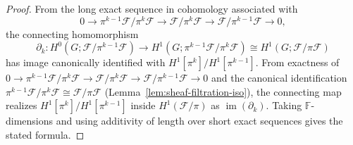 \documentclass[11pt]{amsart}
\theoremstyle{plain}
\theoremstyle{definition}
\newcommand{\unif}{\pi}                        %
\newcommand{\sheaf}[1]{\mathcal{#1}}                  %
\newcommand{\Digit}[1]{\partial_{#1}}%
\DeclareMathOperator{\im}{im}                         %
\begin{document}
\begin{proof}
From the long exact sequence in cohomology associated with
\[
0 \to \unif^{k-1}\sheaf{F}/\unif^k\sheaf{F} \to \sheaf{F}/\unif^k\sheaf{F} \to \sheaf{F}/\unif^{k-1}\sheaf{F} \to 0,
\]
the connecting homomorphism
\[
\Digit{k}: H^0(G;\sheaf{F}/\unif^{k-1}\sheaf{F}) \to H^1(G;\unif^{k-1}\sheaf{F}/\unif^k\sheaf{F}) \cong H^1(G;\sheaf{F}/\unif\sheaf{F})
\]
has image canonically identified with $H^1[\unif^k]/H^1[\unif^{k-1}]$. From exactness of $0 \to \unif^{k-1}\sheaf{F}/\unif^k\sheaf{F} \to \sheaf{F}/\unif^k\sheaf{F} \to \sheaf{F}/\unif^{k-1}\sheaf{F} \to 0$ and the canonical identification $\unif^{k-1}\sheaf{F}/\unif^k\sheaf{F} \cong \sheaf{F}/\unif\sheaf{F}$ (Lemma~\ref{lem:sheaf-filtration-iso}), the connecting map realizes $H^1[\unif^k]/H^1[\unif^{k-1}]$ inside $H^1(\sheaf{F}/\unif)$ as $\im(\Digit{k})$. Taking $\mathbb{F}$-dimensions and using additivity of length over short exact sequences gives the stated formula.
\end{proof}
\end{document}
